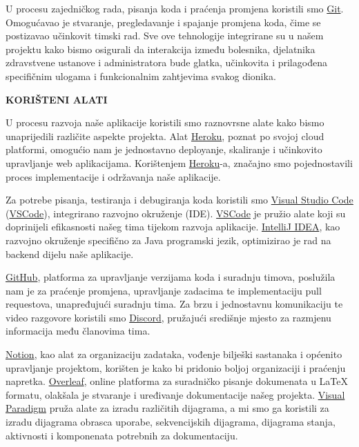 U procesu zajedničkog rada, pisanja koda i praćenja promjena koristili smo \href{https://git-scm.com/}{Git}. Omogućavao je stvaranje, pregledavanje i spajanje promjena koda, čime se postizavao učinkovit timski rad. Sve ove tehnologije integrirane su u našem projektu kako bismo osigurali da interakcija između bolesnika, djelatnika zdravstvene ustanove i administratora bude glatka, učinkovita i prilagođena specifičnim ulogama i funkcionalnim zahtjevima svakog dionika.



\textbf{KORIŠTENI ALATI
}

U procesu razvoja naše aplikacije koristili smo raznovrsne alate kako bismo unaprijedili različite aspekte projekta. Alat \href{https://www.heroku.com}{Heroku}, poznat po svojoj cloud platformi, omogućio nam je jednostavno deployanje, skaliranje i učinkovito upravljanje web aplikacijama. Korištenjem \href{https://www.heroku.com}{Heroku}-a, značajno smo pojednostavili proces implementacije i održavanja naše aplikacije.

Za potrebe pisanja, testiranja i debugiranja koda koristili smo \href{https://www.visualstudio.com}{Visual Studio Code} (\href{https://www.visualstudio.com}{VSCode}), integrirano razvojno okruženje (IDE). \href{https://www.visualstudio.com}{VSCode} je pružio alate koji su doprinijeli efikasnosti našeg tima tijekom razvoja aplikacije. \href{https://www.jetbrains.com/idea}{IntelliJ IDEA}, kao razvojno okruženje specifično za Java programski jezik, optimizirao je rad na backend dijelu naše aplikacije. 

\href{https://github.com}{GitHub}, platforma za upravljanje verzijama koda i suradnju timova, poslužila nam je za praćenje promjena, upravljanje zadacima te implementaciju pull requestova, unapređujući suradnju tima. Za brzu i jednostavnu komunikaciju te video razgovore koristili smo \href{https://discord.com}{Discord}, pružajući središnje mjesto za razmjenu informacija među članovima tima.


\href{https://www.notion.so}{Notion}, kao alat za organizaciju zadataka, vođenje bilješki sastanaka i općenito upravljanje projektom, korišten je kako bi pridonio boljoj organizaciji i praćenju napretka. \href{https://www.overleaf.com}{Overleaf}, online platforma za suradničko pisanje dokumenata u LaTeX formatu, olakšala je stvaranje i uređivanje dokumentacije našeg projekta.
\href{https://www.visual-paradigm.com}{Visual Paradigm} pruža alate za izradu različitih dijagrama, a mi smo ga koristili za izradu dijagrama obrasca uporabe, sekvencijskih dijagrama, dijagrama stanja, aktivnosti i komponenata potrebnih za dokumentaciju. 

